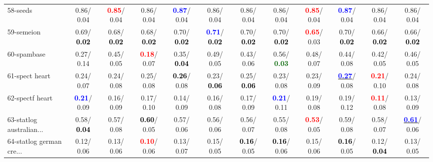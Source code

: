 \begin{table}[h]
\begin{center}
{\begin{tabular}{lc|c|c|c|c|c|c|c|c|c|c}
58-seeds &   0.86/  0.04 & \textcolor{red}{\textbf{  0.85}}/  0.04 &   0.86/  0.04 & \textcolor{blue}{\textbf{  0.87}}/  0.04 &   0.86/  0.04 &   0.86/  0.04 &   0.86/  0.04 & \textcolor{red}{\textbf{  0.85}}/  0.04 & \textcolor{blue}{\textbf{  0.87}}/  0.04 &   0.86/  0.04 &   0.86/  0.04 \\
59-semeion &   0.69/\textcolor{black}{\textbf{  0.02}} &   0.68/\textcolor{black}{\textbf{  0.02}} &   0.68/\textcolor{black}{\textbf{  0.02}} &   0.70/\textcolor{black}{\textbf{  0.02}} & \textcolor{blue}{\textbf{  0.71}}/\textcolor{black}{\textbf{  0.02}} &   0.70/\textcolor{black}{\textbf{  0.02}} &   0.70/\textcolor{black}{\textbf{  0.02}} & \textcolor{red}{\textbf{  0.65}}/  0.03 &   0.70/\textcolor{black}{\textbf{  0.02}} &   0.66/\textcolor{black}{\textbf{  0.02}} &   0.66/\textcolor{black}{\textbf{  0.02}} \\
60-spambase &   0.27/  0.14 &   0.45/  0.05 & \textcolor{red}{\textbf{  0.18}}/  0.07 &   0.35/\textcolor{black}{\textbf{  0.04}} &   0.49/  0.05 &   0.43/  0.06 &   0.56/\textcolor{darkgreen}{\textbf{  0.03}} &   0.48/  0.07 &   0.44/  0.08 &   0.42/  0.05 &   0.46/  0.05 \\ \hline
61-spect heart &   0.24/  0.07 &   0.24/  0.08 &   0.25/  0.08 & \textcolor{black}{\textbf{  0.26}}/  0.08 &   0.23/\textcolor{black}{\textbf{  0.06}} &   0.25/\textcolor{black}{\textbf{  0.06}} &   0.23/  0.08 &   0.23/  0.09 & \underline{\textcolor{blue}{\textbf{  0.27}}}/  0.08 & \textcolor{red}{\textbf{  0.21}}/  0.10 &   0.24/  0.08 \\
62-spectf heart & \textcolor{blue}{\textbf{  0.21}}/  0.09 &   0.16/  0.09 &   0.17/  0.10 &   0.14/  0.09 &   0.16/  0.08 &   0.17/  0.09 & \textcolor{blue}{\textbf{  0.21}}/  0.11 &   0.19/  0.08 &   0.19/  0.12 & \textcolor{red}{\textbf{  0.11}}/  0.08 &   0.13/  0.09 \\
63-statlog australian... &   0.58/\textcolor{black}{\textbf{  0.04}} &   0.57/  0.08 & \textcolor{black}{\textbf{  0.60}}/  0.05 &   0.57/  0.06 &   0.56/  0.06 &   0.56/  0.07 &   0.55/  0.08 & \textcolor{red}{\textbf{  0.53}}/  0.05 &   0.59/  0.08 &   0.58/  0.07 & \underline{\textcolor{blue}{\textbf{  0.61}}}/  0.06 \\
64-statlog german cre... &   0.12/  0.06 &   0.13/  0.06 & \textcolor{red}{\textbf{  0.10}}/  0.06 &   0.13/  0.07 &   0.15/  0.05 & \textcolor{black}{\textbf{  0.16}}/  0.05 & \textcolor{black}{\textbf{  0.16}}/  0.06 &   0.15/  0.06 & \textcolor{black}{\textbf{  0.16}}/  0.05 &   0.12/\textcolor{black}{\textbf{  0.04}} &   0.13/  0.05 \\\end{tabular}
}\label{strats1b5NN}
\end{center}
\end{table}
